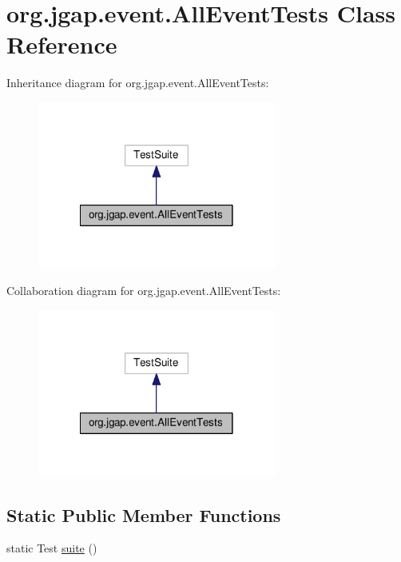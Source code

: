 \hypertarget{classorg_1_1jgap_1_1event_1_1_all_event_tests}{\section{org.\-jgap.\-event.\-All\-Event\-Tests Class Reference}
\label{classorg_1_1jgap_1_1event_1_1_all_event_tests}
}


Inheritance diagram for org.\-jgap.\-event.\-All\-Event\-Tests\-:
\nopagebreak
\begin{figure}[H]
\begin{center}
\leavevmode
\includegraphics[width=222pt]{classorg_1_1jgap_1_1event_1_1_all_event_tests__inherit__graph}
\end{center}
\end{figure}


Collaboration diagram for org.\-jgap.\-event.\-All\-Event\-Tests\-:
\nopagebreak
\begin{figure}[H]
\begin{center}
\leavevmode
\includegraphics[width=222pt]{classorg_1_1jgap_1_1event_1_1_all_event_tests__coll__graph}
\end{center}
\end{figure}
\subsection*{Static Public Member Functions}
\begin{DoxyCompactItemize}
\item 
static Test \hyperlink{classorg_1_1jgap_1_1event_1_1_all_event_tests_a28b55369dfb4eaa5f7eeafb2f8d39901}{suite} ()
\end{DoxyCompactItemize}
